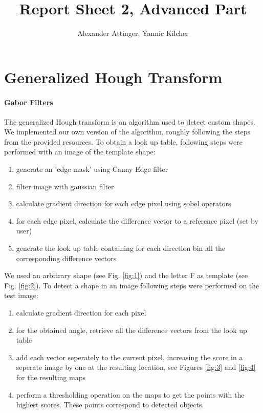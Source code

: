 \documentclass[11pt,a4paper]{article}
\author{Alexander Attinger, Yannic Kilcher}
\title{Report Sheet 2, Advanced Part}
\begin{document}
\maketitle


\section{Generalized Hough Transform}
\paragraph{Gabor Filters}
The generalized Hough transform is an algorithm used to detect custom shapes. We implemented our own version of the algorithm, roughly following the steps	from the provided resources. To obtain a look up table, following steps were performed with an image of the template shape:
\begin{enumerate}
\item generate an 'edge mask' using Canny Edge filter
\item filter image with gaussian filter
\item calculate gradient direction for each edge pixel using sobel operators
\item for each edge pixel, calculate the difference vector to a reference pixel (set by user)
\item generate the look up table containing for each direction bin all the corresponding difference vectors
\end{enumerate}

We used an arbitrary shape (see Fig. \ref{fig:1}) and the letter F as template (see Fig. \ref{fig:2}). To detect a shape in an image following steps were performed on the test image:

\begin{enumerate}
\item calculate gradient direction for each pixel
\item for the obtained angle, retrieve all the difference vectors from the look up table
\item add each vector seperately to the current pixel, increasing the score in a seperate image by one at the resulting location, see Figures \ref{fig:3} and \ref{fig:4} for the resulting maps
\item perform a thresholding operation on the maps to get the points with the highest scores. These points correspond to detected objects.
\end{enumerate}
\end{document}
